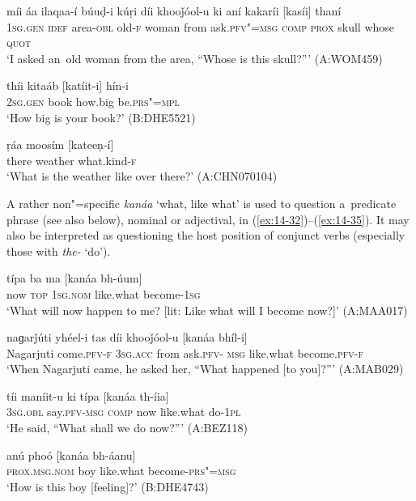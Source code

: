 \begin{exe}
\ex
\label{ex:14-29}
\gll míi áa ilaqaa-í búuḍ-i kúṛi díi khooǰóol-u  ki aní kakaríi [kasíi] thaní \\
\textsc{1sg.gen} \textsc{idef} area-\textsc{obl} old-\textsc{f} woman from ask.\textsc{pfv"=msg} \textsc{comp} \textsc{prox} skull whose \textsc{quot} \\
\glt `I asked an~old woman from the area, ``Whose is this skull?''' (A:WOM459)

\ex
\label{ex:14-30}
\gll thíi kitaáb [katíit-i] hín-i \\
\textsc{2sg.gen} book how.big be.\textsc{prs"=mpl} \\
\glt `How big is your book?' (B:DHE5521)

\ex
\label{ex:14-31}
\gll ṛáa moosím [kateeṇ-í] \\
there weather what.kind-\textsc{f} \\
\glt `What is the weather like over there?' (A:CHN070104)
\end{exe}

A rather non"=specific \textit{kanáa} `what, like what' is used to question a~predicate phrase (see also below), nominal or adjectival, in (\ref{ex:14-32})--(\ref{ex:14-35}). It may also be interpreted as questioning the host position of conjunct verbs (especially those with \textit{the-} `do'). 

\begin{exe}
\ex
\label{ex:14-32}
\gll típa ba ma [kanáa bh-úum] \\
now \textsc{top} \textsc{1sg.nom} like.what become-\textsc{1sg} \\
\glt `What will now happen to me? [lit: Like what will I become now?]' (A:MAA017)

\ex
\label{ex:14-33}
\gll naɡarǰúti yhéel-i tas díi khooǰóol-u [kanáa bhíl-i]\\
Nagarjuti come.\textsc{pfv-f} \textsc{3sg.acc} from ask.\textsc{pfv- msg} like.what become.\textsc{pfv-f}\\
\glt `When Nagarjuti came, he asked her, ``What happened [to you]?''' (A:MAB029)

\ex
\label{ex:14-34}
\gll tíi maníit-u ki típa [kanáa th-íia] \\
\textsc{3sg.obl} say.\textsc{pfv-msg} \textsc{comp} now like.what do-\textsc{1pl} \\
\glt `He said, ``What shall we do now?''' (A:BEZ118)

\ex
\label{ex:14-35}
\gll anú phoó [kanáa bh-áanu] \\
\textsc{prox.msg.nom} boy like.what become-\textsc{prs"=msg} \\
\glt `How is this boy [feeling]?' (B:DHE4743)
\end{exe}

